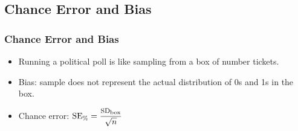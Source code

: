 \documentclass[t]{beamer}
\begin{document}
\subsection{Chance Error and Bias}
\begin{frame}
\frametitle{Chance Error and Bias}

\begin{itemize}
\item Running a political poll is like sampling from a box of number tickets.
\begin{center}
\vspace{5pt}
\end{center}

\item Bias:  sample does not represent the actual distribution of 0s and 1s in the box.
\item Chance error:
$\displaystyle
  \mbox{SE}_{\scriptsize\mbox{\%}} = \frac{\mbox{\footnotesize SD}_{\scriptsize\mbox{box}}}{\sqrt{n}}$
\end{itemize}
\label{lastpage}
\end{frame}
\end{document}
